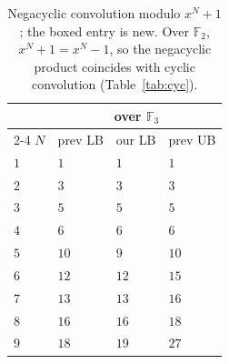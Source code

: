 \documentclass[11pt]{article}
\theoremstyle{definition}
\newcommand{\F}{\mathbb{F}}
\begin{document}
\begin{table}[!ht]
  \centering
  \setlength{\tabcolsep}{12pt}
  \begin{tabular}{llll}
    \toprule
    & \multicolumn{3}{c}{over $\F_3$}                                                                                                       \\
    \cmidrule(lr){2-4}
    $N$ & prev LB                                                     & our LB       & prev UB                                                  \\
    \midrule
    $1$ & $1$                                                         & $1$          & $1$                                                      \\
    $2$ & $3$~\cite{winograd1977some}                                 & $3$          & $3$~\cite{toom1963complexity}                            \\
    $3$ & $5$~\cite{winograd1977some}                                 & $5$          & $5$~\cite{averbuch1991classification,blaser2005complete} \\
    $4$ & $6$~\cite{winograd1977some}                                 & $6$          & $6$~\cite{degroote1983characterization}                  \\
    $5$ & $10$~\cite{blaser2005complete,barbulescu2012finding}        & $9$          & $10$~\cite{cenk2010multiplication}                       \\
    $6$ & $12$~\cite{averbuch1988classification,blaser2005complete}   & $12$         & $15$~\cite{winograd1977some}                             \\
    $7$ & $13$~\cite{degroote1983characterization,blaser2005complete} & $13$         & $16$~\cite{cenk2010multiplication}                       \\
    $8$ & $16$~\cite{blaser2005complete,barbulescu2012finding}        & $16$         & $18$~\cite{cenk2010multiplication}                       \\
    $9$ & $18$~\cite{averbuch1991classification,blaser2005complete}   & $\boxed{19}$ & $27$~\cite{cenk2011multiplication}                       \\
    \bottomrule
  \end{tabular}
  \caption{Negacyclic convolution modulo $x^N+1$; the boxed entry is
    new. Over $\F_2$, $x^N+1=x^N-1$, so the negacyclic product coincides with cyclic
  convolution (Table~\ref{tab:cyc}).}
  \label{tab:nega}
\end{table}
\end{document}
